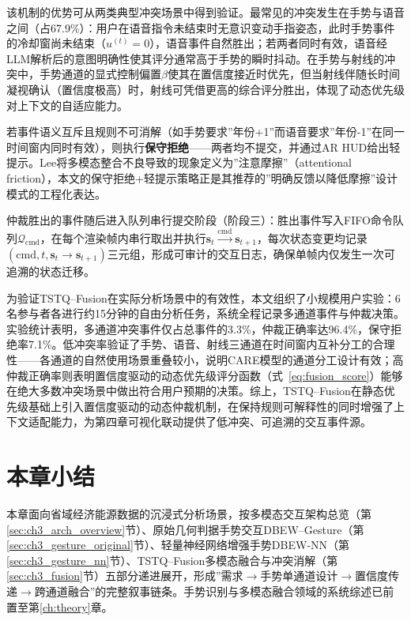 该机制的优势可从两类典型冲突场景中得到验证。最常见的冲突发生在手势与语音之间（占67.9\%）：用户在语音指令未结束时无意识变动手指姿态，此时手势事件的冷却窗尚未结束（$u^{(t)}=0$），语音事件自然胜出；若两者同时有效，语音经LLM解析后的意图明确性使其评分通常高于手势的瞬时抖动。在手势与射线的冲突中，手势通道的显式控制偏置$\beta$使其在置信度接近时优先，但当射线伴随长时间凝视确认（置信度极高）时，射线可凭借更高的综合评分胜出，体现了动态优先级对上下文的自适应能力。

若事件语义互斥且规则不可消解（如手势要求”年份+1”而语音要求”年份-1”在同一时间窗内同时有效），则执行\textbf{保守拒绝}——两者均不提交，并通过AR HUD给出轻提示。Lee\cite{lee2025attentional_friction}将多模态整合不良导致的现象定义为”注意摩擦”（attentional friction），本文的保守拒绝+轻提示策略正是其推荐的”明确反馈以降低摩擦”设计模式的工程化表达。

仲裁胜出的事件随后进入队列串行提交阶段（阶段三）：胜出事件写入FIFO命令队列$\mathcal{Q}_{\mathrm{cmd}}$，在每个渲染帧内串行取出并执行$\mathbf{s}_t \stackrel{\mathrm{cmd}}{\longrightarrow} \mathbf{s}_{t+1}$，每次状态变更均记录$(\mathrm{cmd}, t, \mathbf{s}_t\rightarrow\mathbf{s}_{t+1})$三元组，形成可审计的交互日志，确保单帧内仅发生一次可追溯的状态迁移。


为验证TSTQ--Fusion在实际分析场景中的有效性，本文组织了小规模用户实验：6名参与者各进行约15分钟的自由分析任务，系统全程记录多通道事件与仲裁决策。实验统计表明，多通道冲突事件仅占总事件的3.3\%，仲裁正确率达96.4\%，保守拒绝率7.1\%。低冲突率验证了手势、语音、射线三通道在时间窗内互补分工的合理性——各通道的自然使用场景重叠较小，说明CARE模型的通道分工设计有效；高仲裁正确率则表明置信度驱动的动态优先级评分函数（式~\ref{eq:fusion_score}）能够在绝大多数冲突场景中做出符合用户预期的决策。综上，TSTQ--Fusion在静态优先级基础上引入置信度驱动的动态仲裁机制，在保持规则可解释性的同时增强了上下文适配能力，为第四章可视化联动提供了低冲突、可追溯的交互事件源。

\section{本章小结}
\label{sec:ch3_summary}

本章面向省域经济能源数据的沉浸式分析场景，按多模态交互架构总览（第\ref{sec:ch3_arch_overview}节）、原始几何判据手势交互DBEW--Gesture（第\ref{sec:ch3_gesture_original}节）、轻量神经网络增强手势DBEW-NN（第\ref{sec:ch3_gesture_nn}节）、TSTQ--Fusion多模态融合与冲突消解（第\ref{sec:ch3_fusion}节）五部分递进展开，形成”需求$\rightarrow$手势单通道设计$\rightarrow$置信度传递$\rightarrow$跨通道融合”的完整叙事链条。手势识别与多模态融合领域的系统综述已前置至第\ref{ch:theory}章。

